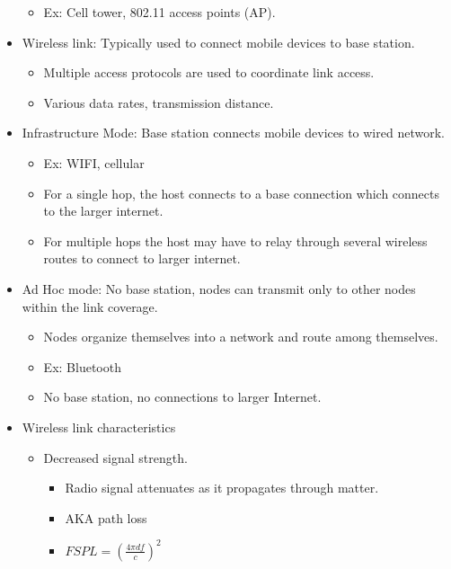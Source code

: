 \documentclass[]{article}
\providecommand{\tightlist}{%
  \setlength{\itemsep}{0pt}\setlength{\parskip}{0pt}}
\begin{document}
\begin{itemize}
  \begin{itemize}
  \tightlist
  \item
    Ex: Cell tower, 802.11 access points (AP).
  \end{itemize}
\item
  Wireless link: Typically used to connect mobile devices to base
  station.

  \begin{itemize}
  \tightlist
  \item
    Multiple access protocols are used to coordinate link access.
  \item
    Various data rates, transmission distance.
  \end{itemize}
\item
  Infrastructure Mode: Base station connects mobile devices to wired
  network.

  \begin{itemize}
  \tightlist
  \item
    Ex: WIFI, cellular
  \item
    For a single hop, the host connects to a base connection which
    connects to the larger internet.
  \item
    For multiple hops the host may have to relay through several
    wireless routes to connect to larger internet.
  \end{itemize}
\item
  Ad Hoc mode: No base station, nodes can transmit only to other nodes
  within the link coverage.

  \begin{itemize}
  \tightlist
  \item
    Nodes organize themselves into a network and route among themselves.
  \item
    Ex: Bluetooth
  \item
    No base station, no connections to larger Internet.
  \end{itemize}
\item
  Wireless link characteristics

  \begin{itemize}
  \tightlist
  \item
    Decreased signal strength.

    \begin{itemize}
    \tightlist
    \item
      Radio signal attenuates as it propagates through matter.
    \item
      AKA path loss
    \item
      \(FSPL = (\frac{4 \pi d f}{c})^2\)


\end{itemize}
\end{itemize}
\end{itemize}
\end{document}
